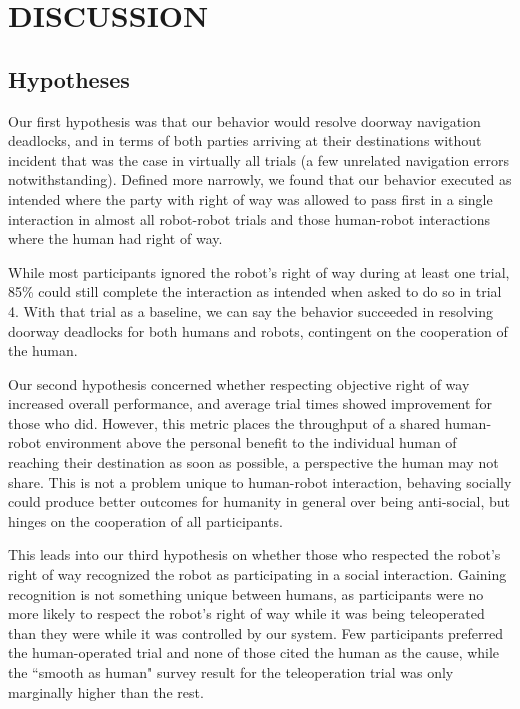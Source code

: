 \documentclass[letterpaper, 10 pt, conference]{ieeeconf}  %
\begin{document}
\section{DISCUSSION}

\subsection{Hypotheses}

Our first hypothesis was that our behavior would resolve doorway navigation deadlocks, and in terms of both parties arriving at their destinations without incident that was the case in virtually all trials (a few unrelated navigation errors notwithstanding). Defined more narrowly, we found that our behavior executed as intended where the party with right of way was allowed to pass first in a single interaction in almost all robot-robot trials and those human-robot interactions where the human had right of way. 

While most participants ignored the robot's right of way during at least one trial, 85\% could still complete the interaction as intended when asked to do so in trial 4. With that trial as a baseline, we can say the behavior succeeded in resolving doorway deadlocks for both humans and robots, contingent on the cooperation of the human.

Our second hypothesis concerned whether respecting objective right of way increased overall performance, and average trial times showed  improvement for those who did. However, this metric places the throughput of a shared human-robot environment above the personal benefit to the individual human of reaching their destination as soon as possible, a perspective the human may not share. This is not a problem unique to human-robot interaction, behaving socially could produce better outcomes for humanity in general over being anti-social, but hinges on the cooperation of all participants.

This leads into our third hypothesis on whether those who respected the robot's right of way recognized the robot as participating in a social interaction. Gaining recognition is not something unique between humans, as participants were no more likely to respect the robot's right of way while it was being teleoperated than they were while it was controlled by our system. Few participants preferred the human-operated trial and none of those cited the human as the cause, while the ``smooth as human" survey result for the teleoperation trial was only marginally higher than the rest.
\end{document}
